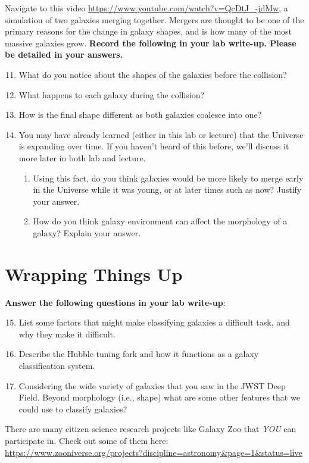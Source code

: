 \documentclass[11pt]{article}
\begin{document}
Navigate to this video \url{https://www.youtube.com/watch?v=QcDtJ_-jdMw}, a simulation of two galaxies merging together. Mergers are thought to be one of the primary reasons for the change in galaxy shapes, and is how many of the most massive galaxies grow. \textbf{Record the following in your lab write-up. Please be detailed in your answers.}
\begin{enumerate}
\setcounter{enumi}{10}
    
    \item What do you notice about the shapes of the galaxies before the collision?
    
    \item What happens to each galaxy during the collision?
    
    \item How is the final shape different as both galaxies coalesce into one?

    \item You may have already learned (either in this lab or lecture) that the Universe is expanding over time. If you haven't heard of this before, we'll discuss it more later in both lab and lecture.
    \begin{enumerate}
        \item Using this fact, do you think galaxies would be more likely to merge early in the Universe while it was young, or at later times such as now? Justify your answer. 


        \item How do you think galaxy environment can affect the morphology of a galaxy? Explain your answer. 
        
    \end{enumerate}
    
\end{enumerate}

\medskip


\section{Wrapping Things Up}
\textbf{Answer the following questions in your lab write-up}:
\begin{enumerate}
\setcounter{enumi}{14}
    
    \item List some factors that might make classifying galaxies a difficult task, and why they make it difficult.
    
    \item Describe the Hubble tuning fork and how it functions as a galaxy classification system.
    
    \item Considering the wide variety of galaxies that you saw in the JWST Deep Field. Beyond morphology (i.e., shape) what are some other features that we could use to classify galaxies?
    
\end{enumerate}


There are many citizen science research projects like Galaxy Zoo that \emph{YOU} can participate in. Check out some of them here: \url{https://www.zooniverse.org/projects?discipline=astronomy&page=1&status=live}
\end{document}
